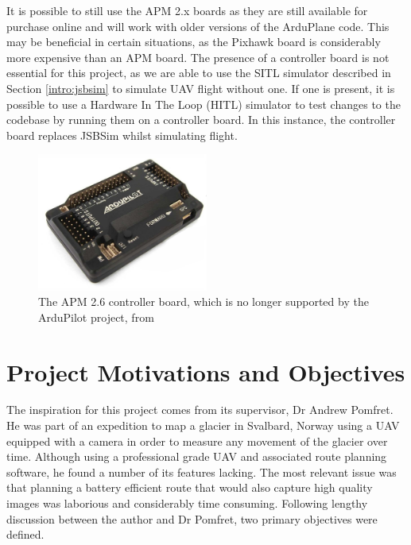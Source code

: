 It is possible to still use the APM 2.x boards as they are still available for purchase online and will work with older versions of the ArduPlane code. This may be beneficial in certain situations, as the Pixhawk board is considerably more expensive than an APM board. The presence of a controller board is not essential for this project, as we are able to use the SITL simulator described in Section \ref{intro:jsbsim} to simulate UAV flight without one. If one is present, it is possible to use a Hardware In The Loop (HITL) simulator to test changes to the codebase by running them on a controller board. In this instance, the controller board replaces JSBSim whilst simulating flight.

\begin{figure}[htbp!] 
\centering    
\includegraphics[width=0.5\textwidth]{APM2}
\caption[APM 2.6 controller board]{The APM 2.6 controller board, which is no longer supported by the ArduPilot project, from \cite{Apm2}}
\label{fig:apm2}
\end{figure}

\section{Project Motivations and Objectives} 
\label{intro:objectives}

The inspiration for this project comes from its supervisor, Dr Andrew Pomfret. He was part of an expedition to map a glacier in Svalbard, Norway using a UAV equipped with a camera in order to measure any movement of the glacier over time. Although using a professional grade UAV and associated route planning software, he found a number of its features lacking. The most relevant issue was that planning a battery efficient route that would also capture high quality images was laborious and considerably time consuming. Following lengthy discussion between the author and Dr Pomfret, two primary objectives were defined.

